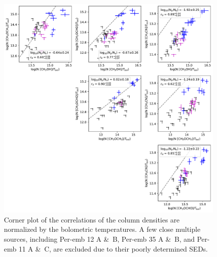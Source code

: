 \documentclass[twocolumn]{aastex62}
\begin{document}
\addtocounter{figure}{-1}
\begin{figure}[htbp!]
  \centering
  \includegraphics[width=\textwidth]{corner_Ncol_correlations_norm_Tbol.pdf}
  \caption{Corner plot of the correlations of the column densities are normalized by the bolometric temperatures.  A few close multiple sources, including Per-emb 12 A \&\ B, Per-emb 35 A \&\ B, and Per-emb 11 A \&\ C, are excluded due to their poorly determined SEDs.}
  \label{fig:corner_tbol}
\end{figure}
\renewcommand{\thefigure}{\arabic{figure}}
\end{document}

